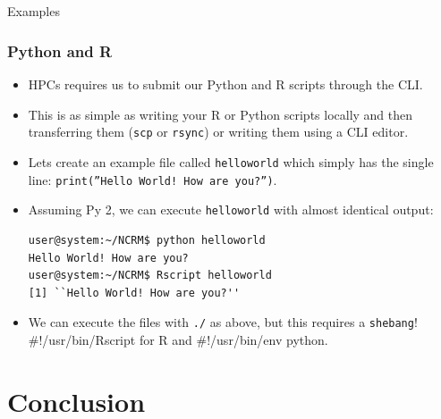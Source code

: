 \documentclass[10pt]{beamer}
\begin{document}
\subsection{}
\begin{frame}[fragile]{Examples}
\frametitle{Python and R}
\begin{itemize}
\item HPCs requires us to submit our Python and R scripts through the CLI.\vspace{0.05in}
\item This is as simple as writing your R or Python scripts locally and then transferring them (\texttt{scp} or \texttt{rsync}) or writing them using a CLI editor.\vspace{0.05in}
\item Lets create an example file called \texttt{helloworld} which simply has the single line: \texttt{print(''Hello World! How are you?'')}.\vspace{0.05in}
\item Assuming Py 2, we can execute \texttt{helloworld} with almost identical output:\vspace{0.05in}
\begin{lstlisting}[style=BashInputStyle,title=Executing Python and R Scripts in the CLI]
user@system:~/NCRM$ python helloworld
Hello World! How are you?
user@system:~/NCRM$ Rscript helloworld
[1] ``Hello World! How are you?''
\end{lstlisting}\vspace{0.1in}
\item We can execute the files with \texttt{./} as above, but this requires a \texttt{shebang}! \#!/usr/bin/Rscript for R and \#!/usr/bin/env python. 
\end{itemize}
\end{frame}


\section{Conclusion}
\end{document}
